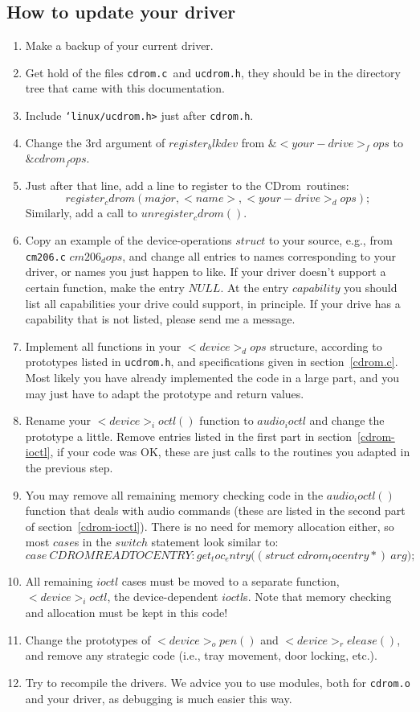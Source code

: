 \documentclass{article}
\def\cdrom{{\sc CDrom}}
\def\cdromc{{\tt cdrom.c}}
\def\ucdrom{{\tt ucdrom.h}}
\begin{document}
\subsection{How to update your driver}

\begin{enumerate}
\item Make a backup of your current driver. 
\item Get hold of the files \cdromc\ and \ucdrom, they should be in
the directory tree that came with this documentation. 
\item Include {\tt \char`\<linux/ucdrom.h>} just after {\tt cdrom.h}.
\item Change the 3rd argument of $register_blkdev$ from
$\&<your-drive>_fops$ to $\&cdrom_fops$. 
\item Just after that line, add a line to register to the \cdrom\
routines: 
$$register_cdrom(major, <name>, <your-drive>_dops);$$
Similarly, add a call to $unregister_cdrom()$. 
\item Copy an example of the device-operations $struct$ to your source,
e.g., from {\tt cm206.c} $cm206_dops$, and change all entries to names
corresponding to your driver, or names you just happen to like. If
your driver doesn't support a certain function, make the entry
$NULL$. At the entry $capability$ you should list all capabilities
your drive could support, in principle. If your drive has a capability
that is not listed, please send me a message.
\item Implement all functions in your $<device>_dops$ structure,
according to prototypes listed in \ucdrom, and specifications given in
section~\ref{cdrom.c}. Most likely you have already implemented
the code in a large part, and you may just have to adapt the prototype
and return values. 
\item Rename your $<device>_ioctl()$ function to $audio_ioctl$ and
change the prototype a little. Remove entries listed in the first part
in section~\ref{cdrom-ioctl}, if your code was OK, these are just calls
to the routines you adapted in the previous step. 
\item You may remove all remaining memory checking code in the
$audio_ioctl()$ function that deals with audio commands (these are
listed in the second part of section~\ref{cdrom-ioctl}). There is no
need for memory allocation either, so most $case$s in the $switch$
statement look similar to:
$$
case\ CDROMREADTOCENTRY\colon
get_toc_entry\bigl((struct\ cdrom_tocentry *{})\ arg\bigr);
$$
\item All remaining $ioctl$ cases must be moved to a separate
function, $<device>_ioctl$, the device-dependent $ioctl$s. Note that
memory checking and allocation must be kept in this code!
\item Change the prototypes of $<device>_open()$ and
$<device>_release()$, and remove any strategic code (i.e., tray
movement, door locking, etc.). 
\item Try to recompile the drivers. We advice you to use modules, both
for {\tt cdrom.o} and your driver, as debugging is much easier this
way.
\end{enumerate} 
\end{document}
